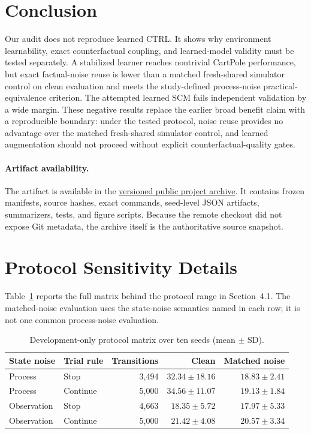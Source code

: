 \documentclass[runningheads]{llncs}
\begin{document}
\section{Conclusion}

Our audit does not reproduce learned CTRL. It shows why environment
learnability, exact counterfactual coupling, and learned-model validity must be
tested separately. A stabilized learner reaches nontrivial CartPole performance,
but exact factual-noise reuse is lower than a matched fresh-shared simulator
control on clean evaluation and meets the study-defined process-noise
practical-equivalence criterion. The attempted learned SCM fails independent validation by a wide
margin. These negative results replace the earlier broad benefit claim with a
reproducible boundary: under the tested protocol, noise reuse provides no
advantage over the matched fresh-shared simulator control, and learned
augmentation should not proceed without explicit
counterfactual-quality gates.

\paragraph{Artifact availability.}
The artifact is available in the
\href{https://github.com/ksajan/ECE595-Causal-RL-Study/tree/claramas-2026-revision-v2/publication_revision}{versioned public project archive}.
It contains frozen manifests, source hashes, exact
commands, seed-level JSON artifacts, summarizers, tests, and figure scripts.
Because the remote checkout did not expose Git metadata, the archive itself is
the authoritative source snapshot.

\appendix
\renewcommand{\theHsection}{appendix.\Alph{section}}
\section{Protocol Sensitivity Details}

Table~\ref{tab:protocol} reports the full matrix behind the protocol range in
Section~4.1. The matched-noise evaluation uses the state-noise semantics named
in each row; it is not one common process-noise evaluation.

\begin{table}[H]
\centering
\caption{Development-only protocol matrix over ten seeds (mean $\pm$ SD).}
\label{tab:protocol}
\small
\begin{tabular}{@{}llrrr@{}}
\toprule
State noise & Trial rule & Transitions & Clean & Matched noise \\
\midrule
Process & Stop & 3,494 & $32.34\pm18.16$ & $18.83\pm2.41$ \\
Process & Continue & 5,000 & $34.56\pm11.07$ & $19.13\pm1.84$ \\
Observation & Stop & 4,663 & $18.35\pm5.72$ & $17.97\pm5.33$ \\
Observation & Continue & 5,000 & $21.42\pm4.08$ & $20.57\pm3.34$ \\
\bottomrule
\end{tabular}
\end{table}
\end{document}

